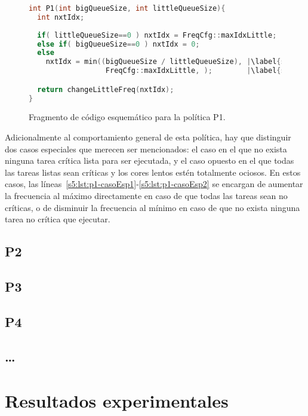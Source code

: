 \begin{figure}
  \centering

  \begin{lstlisting}[language=C++]
int P1(int bigQueueSize, int littleQueueSize){
  int nxtIdx;
      
  if( littleQueueSize==0 ) nxtIdx = FreqCfg::maxIdxLittle; |\label{s5:lst:p1-casoEsp1}|
  else if( bigQueueSize==0 ) nxtIdx = 0;                   |\label{s5:lst:p1-casoEsp2}|
  else
    nxtIdx = min((bigQueueSize / littleQueueSize), |\label{s5:lst:p1-calculoPrincipal(a)}|
                  FreqCfg::maxIdxLittle, );        |\label{s5:lst:p1-calculoPrincipal(b)}|

  return changeLittleFreq(nxtIdx);
}
\end{lstlisting}

  \caption{Fragmento de código esquemático para la política P1.}
  \label{s5:fig:listing-p1}
\end{figure}

Adicionalmente al comportamiento general de esta política, hay que
distinguir dos casos especiales que merecen ser mencionados: el caso en el
que no exista ninguna tarea crítica lista para ser ejecutada, y el caso
opuesto en el que todas las tareas listas sean críticas y los cores lentos
estén totalmente ociosos. En estos casos, las
líneas~\ref{s5:lst:p1-casoEsp1}-\ref{s5:lst:p1-casoEsp2} se encargan de
aumentar la frecuencia al máximo directamente en caso de que todas las
tareas sean no críticas, o de disminuir la frecuencia al mínimo en caso de
que no exista ninguna tarea no crítica que ejecutar.


\subsection{P2}

\subsection{P3}

\subsection{P4}

\subsection{\ldots}


\section{Resultados experimentales}



